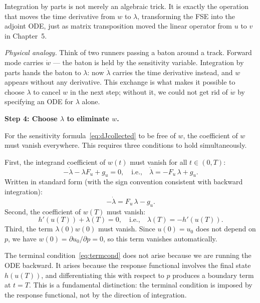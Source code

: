Integration by parts is not merely an algebraic trick.
It is exactly the operation that moves the time derivative
from $w$ to $\lambda$, transforming the FSE into
the adjoint ODE, just as matrix transposition moved
the linear operator from $u$ to $v$ in Chapter~5.

\medskip\noindent\textit{Physical analogy.}
Think of two runners passing a baton around a track.
Forward mode carries $\dot{w}$ --- the baton is held by the sensitivity variable.
Integration by parts hands the baton to $\lambda$: now $\dot{\lambda}$ carries
the time derivative instead, and $w$ appears without any derivative.
This exchange is what makes it possible to choose $\lambda$ to cancel $w$
in the next step; without it, we could not get rid of $\dot{w}$ by specifying
an ODE for $\lambda$ alone.

\medskip
\textbf{Step 4: Choose $\lambda$ to eliminate $w$.}

For the sensitivity formula~\eqref{eq:dJcollected} to be
free of $w$, the coefficient of $w$ must vanish everywhere.
This requires three conditions to hold simultaneously.

First, the integrand coefficient of $w(t)$ must vanish for all $t \in (0,T)$:
\begin{equation}
  -\dot{\lambda} - \lambda F_u + g_u = 0,
  \quad\text{i.e.,}\quad
  \dot{\lambda} = -F_u\,\lambda + g_u.
  \label{eq:adj_wrong_sign}
\end{equation}
Written in standard form (with the sign convention consistent
with backward integration):
\begin{equation}
  \boxed{-\dot{\lambda} = F_u\,\lambda - g_u.}
  \label{eq:adjODE}
\end{equation}
Second, the coefficient of $w(T)$ must vanish:
\begin{equation}
  h'(u(T)) + \lambda(T) = 0,
  \quad\text{i.e.,}\quad
  \lambda(T) = -h'(u(T)).
  \label{eq:termcond}
\end{equation}
Third, the term $\lambda(0)w(0)$ must vanish. Since $u(0) = u_0$
does not depend on $p$, we have $w(0) = \partial u_0/\partial p = 0$,
so this term vanishes automatically.

The terminal condition~\eqref{eq:termcond} does not arise because
we are running the ODE backward. It arises because the response
functional involves the final state $h(u(T))$, and differentiating
this with respect to $p$ produces a boundary term at $t = T$.
This is a fundamental distinction: the terminal condition is imposed
by the response functional, not by the direction of integration.


